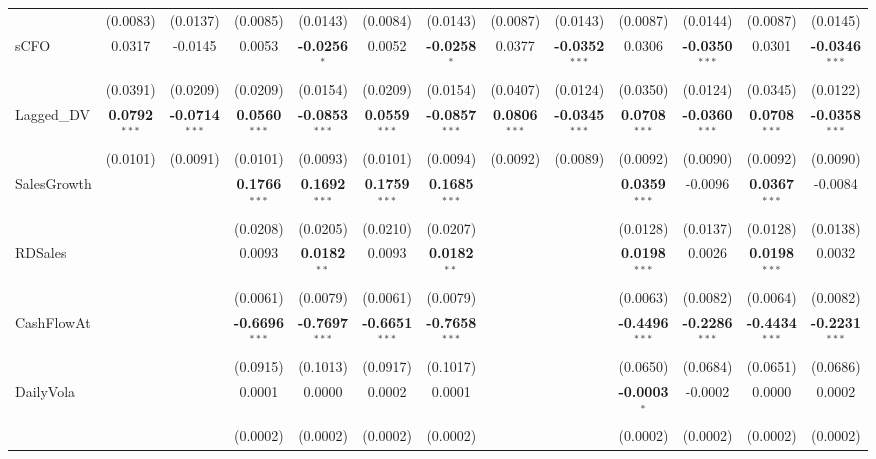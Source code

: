 \begin{landscape}
\begin{table}[H]
\begin{tabular}{lcccccccccccc}
 & (0.0083) & (0.0137) & (0.0085) & (0.0143) & (0.0084) & (0.0143) & (0.0087) & (0.0143) & (0.0087) & (0.0144) & (0.0087) & (0.0145) \\
sCFO & 0.0317 & -0.0145 & 0.0053 & \textbf{-0.0256}$^{*}$ & 0.0052 & \textbf{-0.0258}$^{*}$ & 0.0377 & \textbf{-0.0352}$^{***}$ & 0.0306 & \textbf{-0.0350}$^{***}$ & 0.0301 & \textbf{-0.0346}$^{***}$ \\
 & (0.0391) & (0.0209) & (0.0209) & (0.0154) & (0.0209) & (0.0154) & (0.0407) & (0.0124) & (0.0350) & (0.0124) & (0.0345) & (0.0122) \\
Lagged\_DV & \textbf{0.0792}$^{***}$ & \textbf{-0.0714}$^{***}$ & \textbf{0.0560}$^{***}$ & \textbf{-0.0853}$^{***}$ & \textbf{0.0559}$^{***}$ & \textbf{-0.0857}$^{***}$ & \textbf{0.0806}$^{***}$ & \textbf{-0.0345}$^{***}$ & \textbf{0.0708}$^{***}$ & \textbf{-0.0360}$^{***}$ & \textbf{0.0708}$^{***}$ & \textbf{-0.0358}$^{***}$ \\
 & (0.0101) & (0.0091) & (0.0101) & (0.0093) & (0.0101) & (0.0094) & (0.0092) & (0.0089) & (0.0092) & (0.0090) & (0.0092) & (0.0090) \\
SalesGrowth &  &  & \textbf{0.1766}$^{***}$ & \textbf{0.1692}$^{***}$ & \textbf{0.1759}$^{***}$ & \textbf{0.1685}$^{***}$ &  &  & \textbf{0.0359}$^{***}$ & -0.0096 & \textbf{0.0367}$^{***}$ & -0.0084 \\
 &  &  & (0.0208) & (0.0205) & (0.0210) & (0.0207) &  &  & (0.0128) & (0.0137) & (0.0128) & (0.0138) \\
RDSales &  &  & 0.0093 & \textbf{0.0182}$^{**}$ & 0.0093 & \textbf{0.0182}$^{**}$ &  &  & \textbf{0.0198}$^{***}$ & 0.0026 & \textbf{0.0198}$^{***}$ & 0.0032 \\
 &  &  & (0.0061) & (0.0079) & (0.0061) & (0.0079) &  &  & (0.0063) & (0.0082) & (0.0064) & (0.0082) \\
CashFlowAt &  &  & \textbf{-0.6696}$^{***}$ & \textbf{-0.7697}$^{***}$ & \textbf{-0.6651}$^{***}$ & \textbf{-0.7658}$^{***}$ &  &  & \textbf{-0.4496}$^{***}$ & \textbf{-0.2286}$^{***}$ & \textbf{-0.4434}$^{***}$ & \textbf{-0.2231}$^{***}$ \\
 &  &  & (0.0915) & (0.1013) & (0.0917) & (0.1017) &  &  & (0.0650) & (0.0684) & (0.0651) & (0.0686) \\
DailyVola &  &  & 0.0001 & 0.0000 & 0.0002 & 0.0001 &  &  & \textbf{-0.0003}$^{*}$ & -0.0002 & 0.0000 & 0.0002 \\
 &  &  & (0.0002) & (0.0002) & (0.0002) & (0.0002) &  &  & (0.0002) & (0.0002) & (0.0002) & (0.0002) \\
\midrule

\end{tabular}
\end{table}
\end{landscape}
